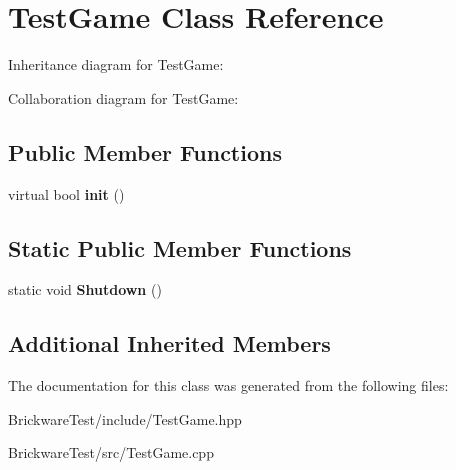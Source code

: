 \hypertarget{classTestGame}{}\section{Test\+Game Class Reference}
\label{classTestGame}


Inheritance diagram for Test\+Game\+:


Collaboration diagram for Test\+Game\+:
\subsection*{Public Member Functions}
\begin{DoxyCompactItemize}
\item 
\hypertarget{classTestGame_abbf832f531d3eccff152c561606da656}{}virtual bool {\bfseries init} ()\label{classTestGame_abbf832f531d3eccff152c561606da656}

\end{DoxyCompactItemize}
\subsection*{Static Public Member Functions}
\begin{DoxyCompactItemize}
\item 
\hypertarget{classTestGame_abc053b12d6547bc4eacaa804d7f34fa8}{}static void {\bfseries Shutdown} ()\label{classTestGame_abc053b12d6547bc4eacaa804d7f34fa8}

\end{DoxyCompactItemize}
\subsection*{Additional Inherited Members}


The documentation for this class was generated from the following files\+:\begin{DoxyCompactItemize}
\item 
Brickware\+Test/include/Test\+Game.\+hpp\item 
Brickware\+Test/src/Test\+Game.\+cpp\end{DoxyCompactItemize}
